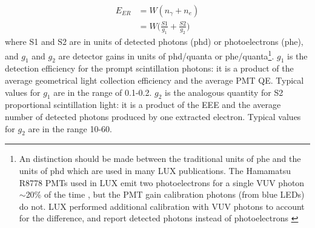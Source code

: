 \begin{equation}
\label{eq:energy}
\begin{split}
E_{ER} &= W (n_{\gamma} + n_{e} ) \\
   &= W \Big(\frac{S1}{g_{1}} + \frac{S2}{g_{2}} \Big)
\end{split}
\end{equation}
where S1 and S2 are in units of detected photons (phd) or photoelectrons (phe), and $g_{1}$ and $g_{2}$ are detector gains in units of phd/quanta or phe/quanta\footnote{An distinction should be made between the traditional units of phe and the units of phd which are used in many LUX publications. The Hamamatsu R8778 PMTs used in LUX emit two photoelectrons for a single VUV photon $\sim$20\% of the time \cite{Faham2015}, but the PMT gain calibration photons (from blue LEDs) do not. LUX performed additional calibration with VUV photons to account for the difference, and report detected photons instead of photoelectrons \cite{LUX:Run03Comprehensive}}. $g_{1}$ is the detection efficiency for the prompt scintillation photons: it is a product of the average geometrical light collection efficiency and the average \ac{PMT} \ac{QE}. Typical values for $g_{1}$ are in the range of 0.1-0.2. $g_{2}$ is the analogous quantity for S2 proportional scintillation light: it is a product of the \ac{EEE} and the average number of detected photons produced by one extracted electron. Typical values for $g_{2}$ are in the range 10-60.

